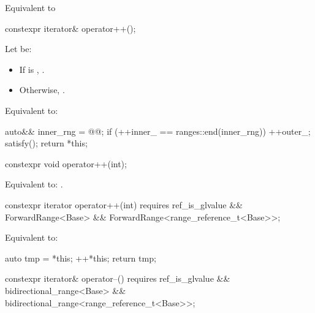 \begin{itemdescr}
\pnum
\effects Equivalent to 
\end{itemdescr}

\begin{itemdecl}
constexpr iterator& operator++();
\end{itemdecl}

\begin{itemdescr}
\pnum
Let  be:
\begin{itemize}
\item If  is , .
\item Otherwise, .
\end{itemize}

\pnum
\effects Equivalent to:
\begin{codeblock}
auto&& inner_rng = @@;
if (++inner_ == ranges::end(inner_rng)) {
  ++outer_;
  satisfy();
}
return *this;
\end{codeblock}
\end{itemdescr}

\begin{itemdecl}
constexpr void operator++(int);
\end{itemdecl}

\begin{itemdescr}
\pnum
\effects Equivalent to: .
\end{itemdescr}

\begin{itemdecl}
constexpr iterator operator++(int)
  requires ref_is_glvalue && ForwardRange<Base> &&
           ForwardRange<range_reference_t<Base>>;
\end{itemdecl}

\begin{itemdescr}
\pnum
\effects Equivalent to:
\begin{codeblock}
auto tmp = *this;
++*this;
return tmp;
\end{codeblock}
\end{itemdescr}

\begin{itemdecl}
constexpr iterator& operator--()
  requires ref_is_glvalue && bidirectional_range<Base> &&
           bidirectional_range<range_reference_t<Base>>;
\end{itemdecl}

